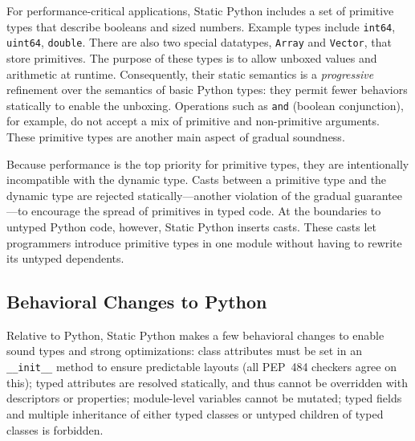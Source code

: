 \documentclass[english,cleveref,submission]{programming}
\newcommand{\SP}{Static Python}
\newcommand{\PEP}{PEP~484}
\newcommand{\code}[1]{\texttt{#1}}
\begin{document}

For performance-critical applications, \SP{} includes a set of primitive types
that describe booleans and sized numbers.
Example types include \code{int64}, \code{uint64}, \code{double}.
There are also two special datatypes, \code{Array} and \code{Vector}, that store primitives.
The purpose of these types is to allow unboxed values and arithmetic at
runtime.
Consequently, their static semantics is a \emph{progressive}~\cite{pqk-onward-2012}
refinement over the semantics of basic Python types:
they permit fewer behaviors statically to enable the unboxing.
Operations such as \code{and} (boolean conjunction), for example, do not accept
a mix of primitive and non-primitive arguments.
These primitive types are another main aspect of gradual soundness.

Because performance is the top priority for primitive types, they
are intentionally incompatible with the dynamic type.
Casts between a primitive type and the dynamic type are rejected
statically---another violation of the gradual guarantee---to encourage the
spread of primitives in typed code.
At the boundaries to untyped Python code, however, \SP{} inserts casts.
These casts let programmers introduce primitive types in one module
without having to rewrite its untyped dependents.





\subsection{Behavioral Changes to Python}
\label{s:not-python}

Relative to Python, \SP{} makes a few behavioral changes to enable
sound types and strong optimizations:
class attributes must be set in an \code{\_\_init\_\_} method to
ensure predictable layouts (all \PEP{} checkers agree on this);
typed attributes are resolved statically, and thus cannot be overridden with
descriptors or properties;
module-level variables cannot be mutated;
typed fields 
and
multiple inheritance of either typed classes or untyped children
of typed classes is forbidden.
\end{document}
